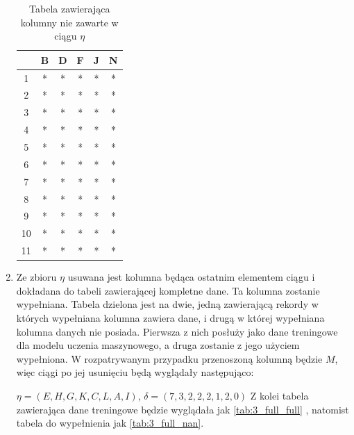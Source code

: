 \documentclass[12pt,twoside]{article}
\begin{document}
\begin{enumerate}[label=\arabic*), leftmargin=1.25cm]
          \begin{table}[ht]
              \caption{Tabela zawierająca kolumny nie zawarte w ciągu $\eta$}
              \centering
              \begin{tabular}{|c|c|c|c|c|c|}
                  \hline
                     & B & D & F & J & N \\ \hline
                  1  & * & * & * & * & * \\ \hline
                  2  & * & * & * & * & * \\ \hline
                  3  & * & * & * & * & * \\ \hline
                  4  & * & * & * & * & * \\ \hline
                  5  & * & * & * & * & * \\ \hline
                  6  & * & * & * & * & * \\ \hline
                  7  & * & * & * & * & * \\ \hline
                  8  & * & * & * & * & * \\ \hline
                  9  & * & * & * & * & * \\ \hline
                  10 & * & * & * & * & * \\ \hline
                  11 & * & * & * & * & * \\ \hline
              \end{tabular}
              \label{tab:3_full}
          \end{table}
          \FloatBarrier



    \item Ze zbioru $\eta$ usuwana jest kolumna będąca ostatnim elementem ciągu
          i dokładana do tabeli zawierającej kompletne dane. Ta kolumna zostanie wypełniana.
          Tabela dzielona jest na dwie, jedną zawierającą rekordy w których wypełniana kolumna zawiera dane,
          i drugą w której wypełniana kolumna danych nie posiada. Pierwsza z nich posłuży jako dane treningowe dla modelu uczenia maszynowego,
          a druga zostanie z jego użyciem wypełniona.
          W rozpatrywanym przypadku przenoszoną kolumną będzie $M$, więc ciągi po jej usunięciu będą wyglądały następująco:

          $\eta=(E,H,G,K,C,L,A,I)$, $\delta=(7,3,2,2,2,1,2,0)$
          Z kolei tabela zawierająca dane treningowe będzie wyglądała jak \ref{tab:3_full_full} , natomist tabela do wypełnienia jak \ref{tab:3_full_nan}.


\end{enumerate}
\end{document}
